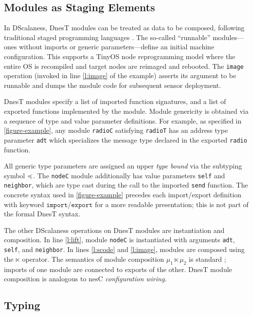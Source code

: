 \subsection{Modules as Staging Elements}

In DScalaness, DnesT modules can be treated as data to be composed, following traditional staged
programming languages \cite{Taha-MetaML}. The so-called ``runnable'' modules---ones without
imports or generic parameters---define an initial machine configuration. This supports a TinyOS
node reprogramming model where the entire OS is recompiled and target nodes are reimaged and
rebooted. The \texttt{image} operation (invoked in line \ref{l:image} of the example) asserts
its argument to be runnable and dumps the module code for subsequent sensor deployment.

DnesT modules specify a list of imported function signatures, and a list of exported functions
implemented by the module. Module genericity is obtained via a sequence of type and value
parameter definitions. For example, as specified in \autoref{figure-example}, any module
\texttt{radioC} satisfying \texttt{radioT} has an address type parameter \texttt{adt} which
specializes the message type declared in the exported \texttt{radio} function.

All generic type parameters are assigned an upper \emph{type bound} via the subtyping symbol
$\preccurlyeq$. The \texttt{nodeC} module additionally has value parameters \texttt{self} and
\texttt{neighbor}, which are type cast during the call to the imported \texttt{send} function.
The concrete syntax used in \autoref{figure-example} precedes each import/export definition with
keyword $\texttt{import}$/$\texttt{export}$ for a more readable presentation; this is not part
of the formal DnesT syntax.
  
The other DScalaness operations on DnesT modules are instantiation and composition. In line
\ref{l:lift}, module \texttt{nodeC} is instantiated with arguments \texttt{adt}, \texttt{self},
and \texttt{neighbor}. In lines \ref{l:scode} and \ref{l:image}, modules are composed using the
$\ltimes$ operator. The semantics of module composition $\mu_1 \ltimes \mu_2$ is standard
\cite{Cardelli-1997}; imports of one module are connected to exports of the other. DnesT module
composition is analogous to nesC \emph{configuration wiring}.

\subsection{Typing} 

